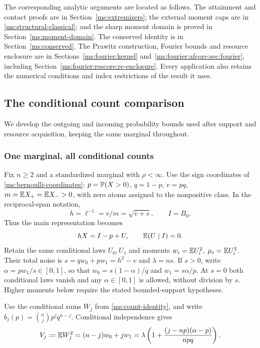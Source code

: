 The corresponding analytic arguments are located as follows. The attainment and
contact proofs are in Section~\ref{ms:extremizers}; the external moment caps
are in \eqref{ms:structural-classical}; and the sharp moment domain is proved
in Section~\ref{ms:moment-domain}. The conserved identity is in
Section~\ref{ms:conserved}. The Prawitz construction, Fourier bounds
and resource enclosure are in Sections~\ref{ms:fourier:kernel}
and~\ref{ms:fourier:afcore:sec:fourier}, including
Section~\ref{ms:fourier:rescore:re-enclosure}. Every application also retains the numerical conditions and index restrictions
of the result it uses.

\subsection{The conditional count comparison}
\label{ms:finite:countcore:sec}

We develop the outgoing and incoming probability bounds used after support
and resource acquisition, keeping the same marginal throughout.

\subsubsection{One marginal, all conditional counts}

Fix $n\ge2$ and a standardized marginal with $\rho<\infty$. Use the sign coordinates of
\eqref{ms:bernoulli-coordinates}: $p=\mathbb P(X>0)$, $q=1-p$, $v=pq$,
$m=\mathbb E X_+=\mathbb E X_->0$, with zero atoms assigned to the nonpositive
class. In the reciprocal-span notation,
\[
 h=\ell^{-1}=v/m=\sqrt{v+s},\qquad I=B_0.
\]
Thus the main representation becomes
\begin{equation}
 hX=I-p+U,\qquad \mathbb E(U\mid I)=0.
 \label{ms:finite:countcore:representation}
\end{equation}
Retain the same conditional laws $U_0,U_1$ and moments
$w_i=\mathbb E U_i^2$, $\mu_i=\mathbb E U_i^3$. Their total noise is
$s=qw_0+pw_1=h^2-v$ and $\lambda=ns$. If $s>0$, write
$\alpha=pw_1/s\in[0,1]$, so that
$w_0=s(1-\alpha)/q$ and $w_1=s\alpha/p$.
At $s=0$ both conditional laws vanish and any $\alpha\in[0,1]$
is allowed, without division by $s$. Higher moments below require the
stated bounded-support hypotheses.

Use the conditional sums $W_j$ from \eqref{ms:count-identity}, and write
$b_j(p)=\binom njp^jq^{n-j}$. Conditional independence gives
\begin{equation}
 V_j:=\mathbb E W_j^2=(n-j)w_0+jw_1
 =\lambda\left(1+\frac{(j-np)(\alpha-p)}{npq}\right).
 \label{ms:finite:countcore:variance}
\end{equation}

